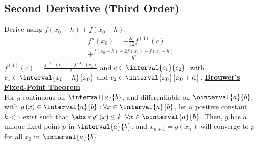 \documentclass{article}
\begin{document}
\begin{minipage}[t]{62.39259259mm}
    \subsection{Second Derivative (Third Order)}
    Derive using \(f\left( x_0 + h \right) + f\left( x_0 - h \right)\):
    \begin{multline*}
        f''\left( x_0 \right) = - \frac{h^2}{12} f^{\left( 4 \right)}\left( c \right) \\
        + \frac{f\left( x_0 + h \right) - 2f\left( x_0 \right) + f\left( x_0 - h \right)}{h^2}
    \end{multline*}
    \(f^{\left( 4 \right)}\left( c \right) = \frac{f^{\left( 4 \right)}\left( c_1 \right) + f^{\left( 4 \right)}\left( c_2 \right)}{2}\) and \(c \in \interval{c_1}{c_2}\),
    with \(c_1 \in \interval{x_0 - h}{x_0}\) and \(c_2 \in \interval{x_0}{x_0 + h}\).
\underline{\textbf{Brouwer's Fixed-Point Theorem}} \\
For \(g\) continuous on \(\interval{a}{b}\), and differentiable on \(\ointerval{a}{b}\), with \(g\left( x \right) \in \interval{a}{b} : \forall x \in \interval{a}{b}\),
let a positive constant \(k < 1\) exist such that \(\abs*{g'\left( x \right)} \leq k\) \(\forall x \in \ointerval{a}{b}\).
Then, \(g\) has a unique fixed-point \(p\) in \(\interval{a}{b}\), and \(x_{n+1} = g\left( x_n \right)\)
will converge to \(p\) for all \(x_0\) in \(\interval{a}{b}\).
\end{minipage}\hfill%
\end{document}
